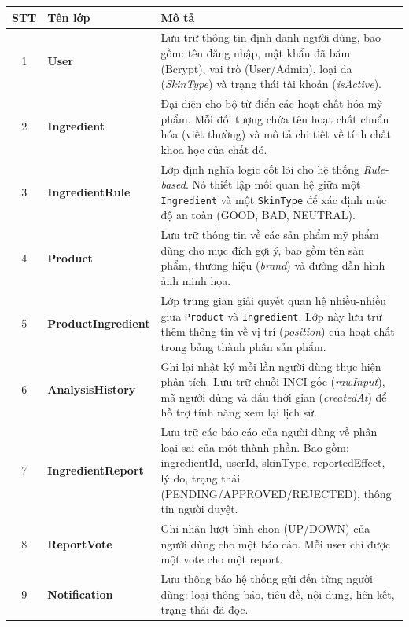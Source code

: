 \documentclass[12pt,a4paper]{article}
\begin{document}
\begin{center}
\renewcommand{\arraystretch}{1.5}
\begin{tabularx}{\textwidth}{|c|l|X|}
\hline
\rowcolor{blue!20}
\textbf{STT} & \textbf{Tên lớp} & \textbf{Mô tả} \\ \hline

1 & \textbf{User} & Lưu trữ thông tin định danh người dùng, bao gồm: tên đăng nhập, mật khẩu đã băm (Bcrypt), vai trò (User/Admin), loại da (\textit{SkinType}) và trạng thái tài khoản (\textit{isActive}). \\ \hline

2 & \textbf{Ingredient} & Đại diện cho bộ từ điển các hoạt chất hóa mỹ phẩm. Mỗi đối tượng chứa tên hoạt chất chuẩn hóa (viết thường) và mô tả chi tiết về tính chất khoa học của chất đó. \\ \hline

3 & \textbf{IngredientRule} & Lớp định nghĩa logic cốt lõi cho hệ thống \textit{Rule-based}. Nó thiết lập mối quan hệ giữa một \texttt{Ingredient} và một \texttt{SkinType} để xác định mức độ an toàn (GOOD, BAD, NEUTRAL). \\ \hline

4 & \textbf{Product} & Lưu trữ thông tin về các sản phẩm mỹ phẩm dùng cho mục đích gợi ý, bao gồm tên sản phẩm, thương hiệu (\textit{brand}) và đường dẫn hình ảnh minh họa. \\ \hline

5 & \textbf{ProductIngredient} & Lớp trung gian giải quyết quan hệ nhiều-nhiều giữa \texttt{Product} và \texttt{Ingredient}. Lớp này lưu trữ thêm thông tin về vị trí (\textit{position}) của hoạt chất trong bảng thành phần sản phẩm. \\ \hline

6 & \textbf{AnalysisHistory} & Ghi lại nhật ký mỗi lần người dùng thực hiện phân tích. Lưu trữ chuỗi INCI gốc (\textit{rawInput}), mã người dùng và dấu thời gian (\textit{createdAt}) để hỗ trợ tính năng xem lại lịch sử. \\ \hline



7 & \textbf{IngredientReport} & Lưu trữ các báo cáo của người dùng về phân loại sai của một thành phần. Bao gồm: ingredientId, userId, skinType, reportedEffect, lý do, trạng thái (PENDING/APPROVED/REJECTED), thông tin người duyệt. \\ \hline
8 & \textbf{ReportVote} & Ghi nhận lượt bình chọn (UP/DOWN) của người dùng cho một báo cáo. Mỗi user chỉ được một vote cho một report. \\ \hline
9 & \textbf{Notification} & Lưu thông báo hệ thống gửi đến từng người dùng: loại thông báo, tiêu đề, nội dung, liên kết, trạng thái đã đọc. \\ \hline
\end{tabularx}
\end{center}
\end{document}
